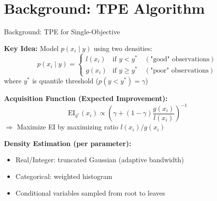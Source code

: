 \documentclass[aspectratio=169, 12pt]{beamer}
\begin{document}
\section{Background: TPE Algorithm}
\begin{frame}{Background: TPE for Single-Objective}

\textbf{Key Idea:} Model \(p(x_i \mid y)\) using two densities:
\[
p(x_i \mid y) = 
\begin{cases}
l(x_i) & \text{if } y < y^* \quad (\text{"good" observations})\\
g(x_i) & \text{if } y \geq y^* \quad (\text{"poor" observations})
\end{cases}
\]
where \(y^*\) is quantile threshold (\(p(y < y^*) = \gamma\))

\vspace{0.3cm}

\textbf{Acquisition Function (Expected Improvement):}
\[
\mathrm{EI}_{y^*}(x_i) \propto \left(\gamma + (1-\gamma)\frac{g(x_i)}{l(x_i)}\right)^{-1}
\]
\(\Rightarrow\) Maximize EI by maximizing ratio \(l(x_i)/g(x_i)\)

\vspace{0.3cm}

\textbf{Density Estimation (per parameter):}
\begin{itemize}
    \item Real/Integer: truncated Gaussian (adaptive bandwidth)
    \item Categorical: weighted histogram
    \item Conditional variables sampled from root to leaves
\end{itemize}

\end{frame}
\end{document}
